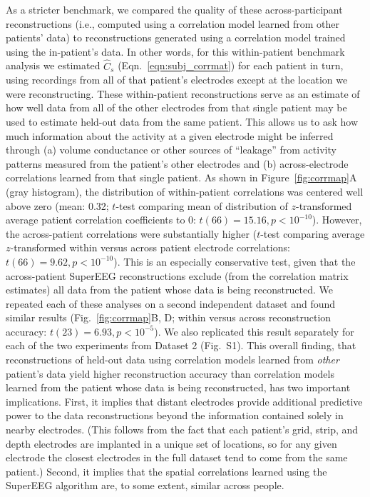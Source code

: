 \documentclass[11pt]{article}
\newcommand{\perexpcorrmaps}{S1}
\begin{document}
As a stricter benchmark, we compared the quality of these
across-participant reconstructions (i.e., computed using a correlation
model learned from other patients' data) to reconstructions generated
using a correlation model trained using the in-patient's data.  In
other words, for this within-patient benchmark analysis we estimated
$\hat{C}_{s}$ (Eqn.~\ref{eqn:subj_corrmat}) for each patient in turn,
using recordings from all of that patient's electrodes except at the
location we were reconstructing.  These within-patient reconstructions
serve as an estimate of how well data from all of the other electrodes
from that single patient may be used to estimate held-out data from
the same patient.  This allows us to ask how much information about
the activity at a given electrode might be inferred through (a) volume
conductance or other sources of ``leakage'' from activity patterns
measured from the patient's other electrodes and (b) across-electrode
correlations learned from that single patient.  As shown in
Figure~\ref{fig:corrmap}A (gray histogram), the distribution of
within-patient correlations was centered well above zero (mean: 0.32;
$t$-test comparing mean of distribution of $z$-transformed average
patient correlation coefficients to 0: $t(66) = 15.16, p < 10^{-10}$).
However, the across-patient correlations were substantially higher
($t$-test comparing average $z$-transformed within versus across
patient electrode correlations: $t(66) = 9.62, p < 10^{-10}$).  This
is an especially conservative test, given that the across-patient
SuperEEG reconstructions exclude (from the correlation matrix
estimates) all data from the patient whose data is being
reconstructed.  We repeated each of these analyses on a second
independent dataset and found similar results
(Fig.~\ref{fig:corrmap}B, D; within versus across reconstruction
accuracy: $t(23) = 6.93, p < 10^{-5}$). We also replicated this result
separately for each of the two experiments from Dataset 2
(Fig.~\perexpcorrmaps).  This overall finding, that reconstructions of
held-out data using correlation models learned from \textit{other}
patient's data yield higher reconstruction accuracy than correlation
models learned from the patient whose data is being reconstructed, has
two important implications.  First, it implies that distant electrodes
provide additional predictive power to the data reconstructions beyond
the information contained solely in nearby electrodes.  (This follows
from the fact that each patient's grid, strip, and depth electrodes
are implanted in a unique set of locations, so for any given electrode
the closest electrodes in the full dataset tend to come from the
same patient.)  Second, it implies that the spatial correlations
learned using the SuperEEG algorithm are, to some extent, similar
across people.
\end{document}
